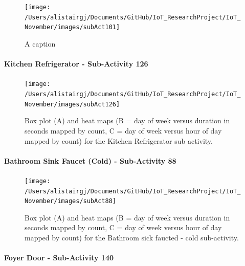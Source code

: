 \documentclass[11pt,]{article}
\let\oldparagraph\paragraph
\renewcommand{\paragraph}[1]{\oldparagraph{#1}\mbox{}}
\begin{document}
\begin{figure}[H]

{\centering \texttt{[image: /Users/alistairgj/Documents/GitHub/IoT\_ResearchProject/IoT\_November/images/subAct101]} 

}

\caption{A caption}\label{fig:subAct101}
\end{figure}

\hypertarget{kitchen-refrigerator---sub-activity-126}{%
\paragraph{Kitchen Refrigerator - Sub-Activity
126}\label{kitchen-refrigerator---sub-activity-126}}

\begin{figure}[H]

{\centering \texttt{[image: /Users/alistairgj/Documents/GitHub/IoT\_ResearchProject/IoT\_November/images/subAct126]} 

}

\caption{Box plot (A) and heat maps (B = day of week versus duration in seconds mapped by count, C = day of week versus hour of day mapped by count) for the Kitchen Refrigerator sub activity.}\label{fig:subAct126}
\end{figure}

\hypertarget{bathroom-sink-faucet-cold---sub-activity-88}{%
\paragraph{Bathroom Sink Faucet (Cold) - Sub-Activity
88}\label{bathroom-sink-faucet-cold---sub-activity-88}}

\begin{figure}[H]

{\centering \texttt{[image: /Users/alistairgj/Documents/GitHub/IoT\_ResearchProject/IoT\_November/images/subAct88]} 

}

\caption{Box plot (A) and heat maps (B = day of week versus duration in seconds mapped by count, C = day of week versus hour of day mapped by count) for the Bathroom sick faucted - cold sub-activity.}\label{fig:subAct88}
\end{figure}

\hypertarget{foyer-door---sub-activity-140}{%
\paragraph{Foyer Door - Sub-Activity
140}\label{foyer-door---sub-activity-140}}
\end{document}
